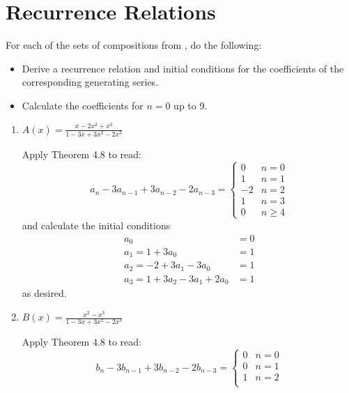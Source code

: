 \section{Recurrence Relations}

\begin{xca}
  For each of the sets of compositions from , do the following:
  \begin{itemize}[nosep]
    \item Derive a recurrence relation and initial conditions for the coefficients of the corresponding generating series.
    \item Calculate the coefficients for $n=0$ up to 9.
  \end{itemize}
\end{xca}
\begin{enumerate}
  \item $A(x) = \frac{x-2x^2+x^3}{1-3x+3x^2-2x^3}$
        \begin{sol}
          Apply Theorem 4.8 to read:
          \[
            a_n - 3a_{n-1} + 3a_{n-2} - 2a_{n-3} = \begin{cases}
              0  & n = 0    \\
              1  & n = 1    \\
              -2 & n = 2    \\
              1  & n = 3    \\
              0  & n \geq 4
            \end{cases}
          \]
          and calculate the initial conditions
          \begin{align*}
            a_0                          & = 0 \\
            a_1 = 1 + 3a_0               & = 1 \\
            a_2 = -2 + 3a_1 - 3a_0       & = 1 \\
            a_3 = 1 + 3a_2 - 3a_1 + 2a_0 & = 1
          \end{align*}
          as desired.
        \end{sol}
  \item $B(x) = \frac{x^2-x^3}{1-3x+3x^2-2x^3}$
        \begin{sol}
          Apply Theorem 4.8 to read:
          \[
            b_n - 3b_{n-1} + 3b_{n-2} - 2b_{n-3} = \begin{cases}
              0  & n = 0    \\
              0  & n = 1    \\
              1  & n = 2    \\

\end{cases}\]
\end{sol}
\end{enumerate}

